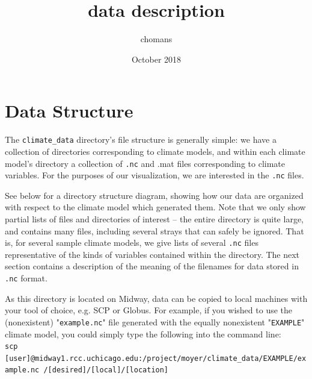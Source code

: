 \documentclass{article}
\title{data description}
\author{chomans }
\date{October 2018}
\begin{document}
\section{Data Structure}
The \texttt{climate\_data} directory's file structure is generally simple: we have a collection of directories corresponding to climate models, and within each climate model's directory a collection of \texttt{.nc} and .mat files corresponding to climate variables. For the purposes of our visualization, we are interested in the \texttt{.nc} files.

See below for a directory structure diagram, showing how our data are organized with respect to the climate model which generated them. Note that we only show partial lists of files and directories of interest -- the entire directory is quite large, and contains many files, including several strays that can safely be ignored. That is, for several sample climate models, we give lists of several \texttt{.nc} files representative of the kinds of variables contained within the directory. The next section contains a description of the meaning of the filenames for data stored in \texttt{.nc} format.

\medskip
{}\medskip

As this directory is located on Midway, data can be copied to local machines with your tool of choice, e.g. SCP or Globus. For example, if you wished to use the (nonexistent) "\texttt{example.nc}" file generated with the equally nonexistent "\texttt{EXAMPLE}" climate model, you could simply type the following into the command line:\\ 


\texttt{scp [user]@midway1.rcc.uchicago.edu:/project/moyer/climate\_data/EXAMPLE/example.nc /[desired]/[local]/[location]}
\end{document}
